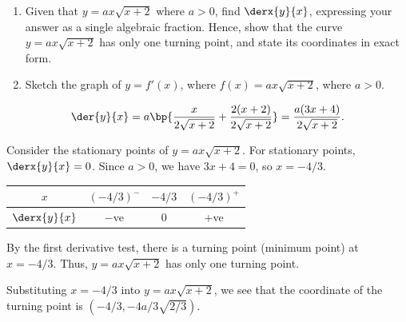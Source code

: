 \begin{problem}
    \begin{enumerate}
        \item Given that $y=ax\sqrt{x+2}$ where $a > 0$, find $\derx{y}{x}$, expressing your answer as a single algebraic fraction. Hence, show that the curve $y = ax\sqrt{x+2}$ has only one turning point, and state its coordinates in exact form.
        \item Sketch the graph of $y = f'(x)$, where $f(x) = ax\sqrt{x+2}$, where $a > 0$.
    \end{enumerate}
\end{problem}
\begin{solution}
    \begin{ppart}
        \[\der{y}{x} = a \bp{\frac{x}{2\sqrt{x+2}} + \frac{2(x+2)}{2\sqrt{x+2}}} = \frac{a(3x+4)}{2\sqrt{x+2}}.\]

        Consider the stationary points of $y=ax\sqrt{x+2}$. For stationary points, $\derx{y}{x} =0$. Since $a > 0$, we have $3x+4 = 0$, so $x = -4/3$.

        \begin{table}[H]
            \centering
            \begin{tabular}{|c|c|c|c|}
            \hline
            $x$ & $(-4/3)^-$ & $-4/3$ & $(-4/3)^+$ \\\hline
            $\derx{y}{x}$ & $-$ve & 0 & +ve \\\hline
            \end{tabular}
        \end{table}

        By the first derivative test, there is a turning point (minimum point) at $x = -4/3$. Thus, $y = ax\sqrt{x+2}$ has only one turning point.

        Substituting $x = -4/3$ into $y = ax\sqrt{x+2}$, we see that the coordinate of the turning point is $(-4/3, -4a/3 \sqrt{2/3})$.
    \end{ppart}
    \begin{ppart}
        \begin{center}
\end{center}
\end{ppart}
\end{solution}
